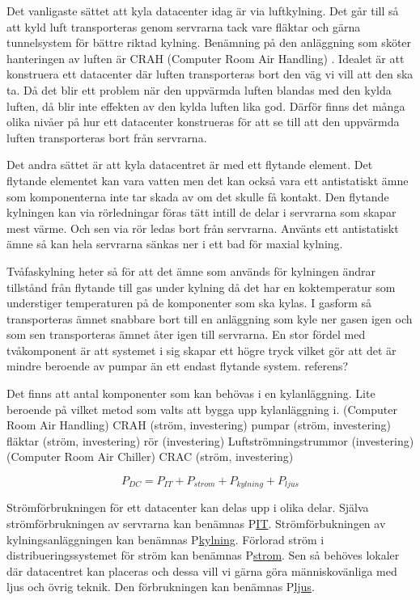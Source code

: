 \documentclass[conference,a4paper]{IEEEtran}
\begin{document}
Det vanligaste sättet att kyla datacenter idag är via luftkylning. Det går till så att kyld luft 
transporteras genom servrarna tack vare fläktar och gärna tunnelsystem för bättre riktad kylning. 
Benämning på den anläggning som sköter hanteringen av luften är CRAH (Computer Room Air Handling) \cite{modelling1}.
Idealet är att konstruera ett datacenter där luften transporteras bort den väg vi vill att den ska ta. 
Då det blir ett problem när den uppvärmda luften blandas med den kylda luften, då blir inte effekten
av den kylda luften lika god. Därför finns det många olika nivåer på hur ett datacenter konstrueras 
för att se till att den uppvärmda luften transporteras bort från servrarna. \cite{modelling2} \cite{}

Det andra sättet är att kyla datacentret är med ett flytande element. Det flytande elementet kan vara 
vatten men det kan också vara ett antistatiskt ämne som komponenterna inte tar skada av om det skulle 
få kontakt. Den flytande kylningen kan via rörledningar föras tätt intill de delar i servrarna som
skapar mest värme. Och sen via rör ledas bort från servrarna. Använts ett antistatiskt ämne så kan 
hela servrarna sänkas ner i ett bad för maxial kylning. 

Tvåfaskylning heter så för att det ämne som används för kylningen ändrar tillstånd från flytande till gas 
under kylning då det har en koktemperatur som understiger temperaturen på de komponenter som ska kylas. 
I gasform så transporteras ämnet snabbare bort till en anläggning som kyle ner gasen igen och som sen 
transporteras ämnet åter igen till servrarna. En stor fördel med tvåkomponent är att systemet i sig skapar ett 
högre tryck vilket gör att det är mindre beroende av pumpar än ett endast flytande system. referens?

Det finns att antal komponenter som kan behövas i en kylanläggning. Lite beroende på vilket metod som valts 
att bygga upp kylanläggning i. 
(Computer Room Air Handling) CRAH (ström, investering)
pumpar (ström, investering)
fläktar (ström, investering)
rör (investering)
Luftströmningstrummor (investering) 
(Computer Room Air Chiller) CRAC (ström, investering)

\[P_{DC} = P_{IT} + P_{strom} + P_{kylning} + P_{ljus} \]

Strömförbrukningen för ett datacenter kan delas upp i olika delar. Själva strömförbrukningen av servrarna 
kan benämnas P\underline{IT}. Strömförbukningen av kylningsanläggningen kan benämnas P\underline{kylning}. 
Förlorad ström i distribueringssystemet för ström kan benämnas P\underline{strom}. Sen så behöves lokaler
där datacentret kan placeras och dessa vill vi gärna göra människovänliga med ljus och övrig teknik. Den 
förbrukningen kan benämnas P\underline{ljus}. 
\end{document}
